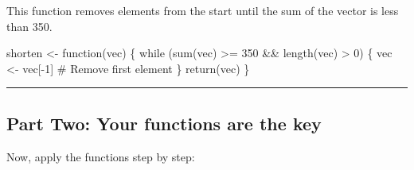 \documentclass[
  letterpaper,
  DIV=11,
  numbers=noendperiod]{scrartcl}
\newenvironment{Shaded}{\begin{snugshade}}{\end{snugshade}}
\newcommand{\CommentTok}[1]{\textcolor[rgb]{0.37,0.37,0.37}{#1}}
\newcommand{\ControlFlowTok}[1]{\textcolor[rgb]{0.00,0.23,0.31}{#1}}
\newcommand{\DecValTok}[1]{\textcolor[rgb]{0.68,0.00,0.00}{#1}}
\newcommand{\FunctionTok}[1]{\textcolor[rgb]{0.28,0.35,0.67}{#1}}
\newcommand{\NormalTok}[1]{\textcolor[rgb]{0.00,0.23,0.31}{#1}}
\newcommand{\OtherTok}[1]{\textcolor[rgb]{0.00,0.23,0.31}{#1}}
\newcommand{\SpecialCharTok}[1]{\textcolor[rgb]{0.37,0.37,0.37}{#1}}
\begin{document}
This function removes elements from the start until the sum of the
vector is less than 350.

\begin{Shaded}
\begin{Highlighting}[]
\NormalTok{shorten }\OtherTok{\textless{}{-}} \ControlFlowTok{function}\NormalTok{(vec) \{}
  \ControlFlowTok{while}\NormalTok{ (}\FunctionTok{sum}\NormalTok{(vec) }\SpecialCharTok{\textgreater{}=} \DecValTok{350} \SpecialCharTok{\&\&} \FunctionTok{length}\NormalTok{(vec) }\SpecialCharTok{\textgreater{}} \DecValTok{0}\NormalTok{) \{}
\NormalTok{    vec }\OtherTok{\textless{}{-}}\NormalTok{ vec[}\SpecialCharTok{{-}}\DecValTok{1}\NormalTok{]  }\CommentTok{\# Remove first element}
\NormalTok{  \}}
  \FunctionTok{return}\NormalTok{(vec)}
\NormalTok{\}}
\end{Highlighting}
\end{Shaded}

\begin{center}\rule{0.5\linewidth}{0.5pt}\end{center}

\subsection{Part Two: Your functions are the
key}\label{part-two-your-functions-are-the-key}

Now, apply the functions step by step:
\end{document}
